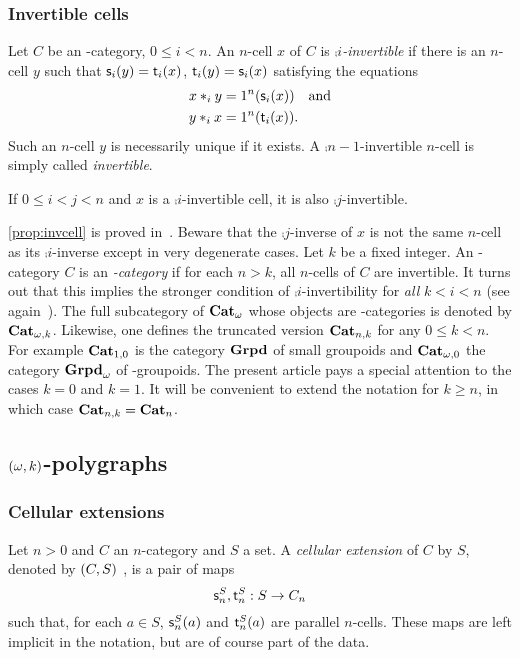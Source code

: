 \subsubsection{Invertible cells}\label{ssubsec:invert}
Let $C$ be an \oo-category, $0\leq i <n$. An $n$-cell $x$ of $C$ is {\em $\comp i$-invertible} if there is an $n$-cell $y$ such that $\mathsf{s}_{i}(y)=\mathsf{t}_{i}(x)$, $\mathsf{t}_{i}(y)=\mathsf{s}_{i}(x)$ satisfying the equations 
  \begin{align*}
    x\ast_{i} y & = 1^{n}(\mathsf{s}_{i}(x)) \quad \hbox{and}\\
    y\ast_{i} x & =  1^{n}(\mathsf{t}_{i}(x)).
  \end{align*}
  Such an $n$-cell $y$ is necessarily unique if it exists. A
  $\comp {n-1}$-invertible $n$-cell is simply called {\em invertible}. 
  \begin{proposition}\label{prop:invcell}
    If $0\leq i< j<n$ and $x$ is a $\comp i$-invertible cell, it is also $\comp j$-invertible.
  \end{proposition}
  \begin{paragr}
    \cref{prop:invcell} is proved
    in~\cite[14.5]{abgmmm:polybk}. Beware that the $\comp j$-inverse
    of $x$ is not the same $n$-cell as its $\comp i$-inverse except in
    very degenerate cases. Let $k$ be a fixed integer. An \oo-category
    $C$ is an {\em {}-category} if for each $n>k$, all $n$-cells
    of $C$ are invertible. It turns out that this implies the stronger
    condition of $\comp i$-invertibility for {\em all} $k<i<n$ (see
    again~\cite[14.5]{abgmmm:polybk}).  The full subcategory of
    $\mathbf{Cat}_{\omega}$ whose objects are -categories is denoted by $\mathbf{Cat}_{\omega,k}$. Likewise, one defines the truncated version $\mathbf{Cat}_{n,k}$ for
    any $0\leq k<n$.  For example $\mathbf{Cat}_{1,0}$ is the category $\mathbf{Grpd}$
    of small groupoids and $\mathbf{Cat}_{\omega,0}$ the category $\mathbf{Grpd}_{\omega}$ of
    \oo-groupoids. The present article pays a special attention to the
    cases $k=0$ and $k=1$. It will be convenient to extend the
    notation for $k\geq n$, in which case $\mathbf{Cat}_{n,k}=\mathbf{Cat}_{n}$.
 \end{paragr} 


 \subsection{$(\omega,k)$-polygraphs}\label{subsec:okpol}
 \subsubsection{Cellular extensions}\label{ssubsec:cellext}
 Let $n>0$ and $C$ an $n$-category and $S$ a set. A {\em cellular
   extension} of $C$ by $S$, denoted by $(C,S)$ , is a pair of maps
 \[\mathsf{s}_{n}^S,\mathsf{t}_{n}^S:S\to C_n\]
 such that, for each $a\in S$, $\mathsf{s}_{n}^S(a)$ and $\mathsf{t}_{n}^S(a)$ are
 parallel $n$-cells. These maps are left implicit in the notation, but
 are of course part of the data. 
 
